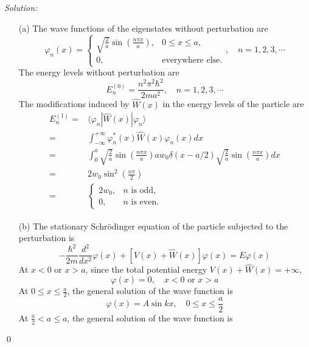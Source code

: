 \documentclass[10pt,a4paper]{article}
\newenvironment{sol}
    {\emph{Solution:}
    }
    {
    \qed
    }
\begin{document}
\begin{sol}
\begin{itemize}
\item[(a)] The wave functions of the eigenstates without perturbation are
\begin{equation}
\varphi_n(x)=\left\{\begin{array}{ll}
\sqrt{\frac{2}{a}}\sin\left(\frac{n\pi x}{a}\right),&0\leq x\leq a,\\
0,&\text{everywhere else.}
\end{array}\right.,\quad n=1,2,3,\cdots
\end{equation}
The energy levels without perturbation are
\begin{equation}
E_n^{(0)}=\frac{n^2\pi^2\hbar^2}{2ma^2},\quad n=1,2,3,\cdots
\end{equation}
The modifications induced by $\hat{W}(x)$ in the energy levels of the particle are
\begin{align}
\nonumber E_n^{(1)}=&\langle\varphi_n|\hat{W}(x)|\varphi_n\rangle\\
\nonumber=&\int_{-\infty}^{+\infty}\varphi_n^*(x)\hat{W}(x)\varphi_n(x)dx\\
\nonumber=&\int_0^a\sqrt{\frac{2}{a}}\sin\left(\frac{n\pi x}{a}\right)aw_0\delta(x-a/2)\sqrt{\frac{2}{a}}\sin\left(\frac{n\pi x}{a}\right)dx\\
\nonumber=&2w_0\sin^2\left(\frac{n\pi}{2}\right)\\
=&\left\{\begin{array}{ll}
2w_0,&n\text{ is odd},\\
0,&n\text{ is even}.
\end{array}\right.
\end{align}
\item[(b)] The stationary Schrödinger equation of the particle subjected to the perturbation is
\begin{equation}
-\frac{\hbar^2}{2m}\frac{d^2}{dx^2}\varphi(x)+[V(x)+\hat{W}(x)]\varphi(x)=E\varphi(x)
\end{equation}
At $x<0$ or $x>a$, since the total potential energy $V(x)+\hat{W}(x)=+\infty$,
\begin{equation}
\varphi(x)=0,\quad x<0\text{ or }x>a
\end{equation}
At $0\leq x\leq \frac{a}{2}$, the general solution of the wave function is
\begin{equation}
\varphi(x)=A\sin kx,\quad0\leq x\leq \frac{a}{2}
\end{equation}
At $\frac{a}{2}<a\leq a$, the general solution of the wave function is

\end{itemize}
\end{sol}
\end{document}
